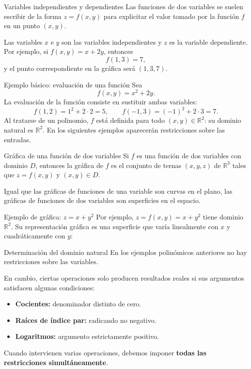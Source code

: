 \documentclass[main.tex]{subfiles}
\begin{document}
\begin{frame}{Variables independientes y dependientes}
Las funciones de dos variables se suelen escribir de la forma $z=f(x,y)$ para explicitar el valor tomado por la función $f$ en un punto $(x,y)$.
\medskip

Las variables $x$ e $y$ son las variables independientes y $z$ es la variable dependiente.
\medskip
Por ejemplo, si $f(x,y)=x+2y$, entonces
\[
f(1,3)=7,
\]
y el punto correspondiente en la gráfica será $(1,3,7)$.
\end{frame}
\begin{frame}{Ejemplo básico: evaluación de una función}
Sea
\[
f(x,y)=x^2+2y.
\]
La evaluación de la función consiste en sustituir ambas variables:
\[
f(1,2)=1^2+2\cdot 2=5,\qquad
f(-1,3)=(-1)^2+2\cdot 3=7.
\]
\medskip
Al tratarse de un polinomio, $f$ está definida para todo
$(x,y)\in\mathbb R^2$: su dominio natural es $\mathbb R^2$.
\medskip
En los siguientes ejemplos aparecerán restricciones sobre las entradas.
\end{frame}

\begin{frame}{Gráfica de una función de dos variables}
\small Si $f$ es una función de dos variables con dominio $D$, entonces la gráfica de $f$ es el conjunto de ternas $(x,y,z)$ de $\mathbb{R}^3$ tales que $z=f(x,y)$ y $(x,y)\in D$.
\medskip

Igual que las gráficas de funciones de una variable son curvas en el plano, las gráficas de funciones de dos variables son superficies en el espacio.
\end{frame}
\begin{frame}{Ejemplo de gráfica: $z=x+y^2$}
Por ejemplo, $z=f(x,y)=x+y^2$ tiene dominio $\mathbb R^2$.
Su representación gráfica es una superficie que varía linealmente
con $x$ y cuadráticamente con $y$:
\end{frame}
\begin{frame}{Determinación del dominio natural}
En los ejemplos polinómicos anteriores no hay restricciones
sobre las variables.
\medskip

En cambio, ciertas operaciones solo producen resultados reales si
sus argumentos satisfacen algunas condiciones:
\begin{itemize}
\item \textbf{Cocientes:} denominador distinto de cero.
\item \textbf{Raíces de índice par:} radicando no negativo.
\item \textbf{Logaritmos:} argumento estrictamente positivo.
\end{itemize}
\medskip
Cuando intervienen varias operaciones, debemos imponer
\textbf{todas las restricciones simultáneamente}.
\end{frame}
\end{document}
